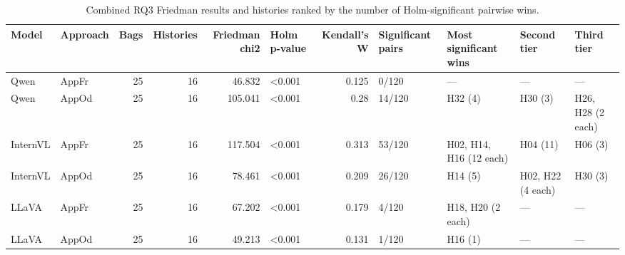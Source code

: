 \begin{table}[tbp]
\caption{Combined RQ3 Friedman results and histories ranked by the number of Holm-significant pairwise wins.}
\label{tab:rq3-final-summary}
\begin{tabular}{llrrrlrllll}
\toprule
Model & Approach & Bags & Histories & Friedman chi2 & Holm p-value & Kendall's W & Significant pairs & Most significant wins & Second tier & Third tier \\
\midrule
Qwen & AppFr & 25 & 16 & 46.832 & <0.001 & 0.125 & 0/120 & — & — & — \\
Qwen & AppOd & 25 & 16 & 105.041 & <0.001 & 0.28 & 14/120 & H32 (4) & H30 (3) & H26, H28 (2 each) \\
InternVL & AppFr & 25 & 16 & 117.504 & <0.001 & 0.313 & 53/120 & H02, H14, H16 (12 each) & H04 (11) & H06 (3) \\
InternVL & AppOd & 25 & 16 & 78.461 & <0.001 & 0.209 & 26/120 & H14 (5) & H02, H22 (4 each) & H30 (3) \\
LLaVA & AppFr & 25 & 16 & 67.202 & <0.001 & 0.179 & 4/120 & H18, H20 (2 each) & — & — \\
LLaVA & AppOd & 25 & 16 & 49.213 & <0.001 & 0.131 & 1/120 & H16 (1) & — & — \\
\bottomrule
\end{tabular}
\end{table}
